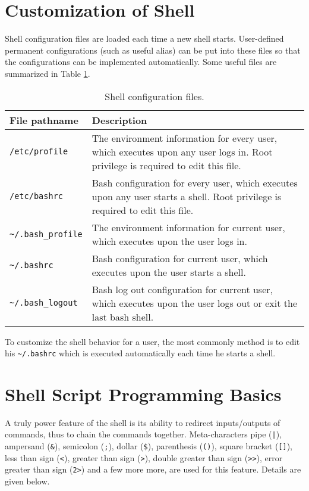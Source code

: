 {\section{Customization of Shell} \label{ch:sb:subsec:customizeshell}

Shell configuration files are loaded each time a new shell starts. User-defined permanent configurations (such as useful alias) can be put into these files so that the configurations can be implemented automatically. Some useful files are summarized in Table \ref{ch:sb:tab:shellconfig}.

\begin{table}
	\centering \caption{Shell configuration files.}\label{ch:sb:tab:shellconfig}
	\begin{tabularx}{\textwidth}{lX}
		\hline
		File pathname & Description \\ \hline
		\verb|/etc/profile| & The environment information for every user, which executes upon any user logs in. Root privilege is required to edit this file.  \\ 
		\verb|/etc/bashrc| & Bash configuration for every user, which executes upon any user starts a shell. Root privilege is required to edit this file. \\ 
		\verb|~/.bash_profile| & The environment information for current user, which executes upon the user logs in. \\ 
		\verb|~/.bashrc| & Bash configuration for current user, which executes upon the user starts a shell. \\ 
		\verb|~/.bash_logout| & Bash log out configuration for current user, which executes upon the user logs out or exit the last bash shell. \\ \hline
	\end{tabularx}
\end{table}

To customize the shell behavior for a user, the most commonly method is to edit his \verb|~/.bashrc| which is executed automatically each time he starts a shell.

\section{Shell Script Programming Basics}

A truly power feature of the shell is its ability to redirect inputs/outputs of commands, thus to chain the commands together. Meta-characters pipe (\verb?|?), ampersand (\verb|&|), semicolon (\verb|;|), dollar (\verb|$|), parenthesis (\verb|()|), square bracket (\verb|[]|), less than sign (\verb|<|), greater than sign (\verb|>|), double greater than sign (\verb|>>|), error greater than sign (\verb|2>|) and a few more more, are used for this feature. Details are given below.

}
